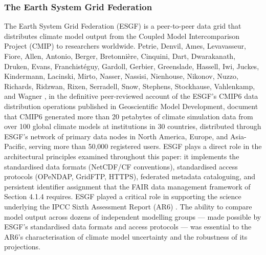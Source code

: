 \documentclass[12pt,a4paper]{report}
\begin{document}
\subsubsection{The Earth System Grid Federation}
The Earth System Grid Federation (ESGF) is a peer-to-peer data grid that distributes climate model output from the Coupled Model 
Intercomparison Project (CMIP) to researchers worldwide. Petrie, Denvil, Ames, Levavasseur, Fiore, Allen, Antonio, Berger, Bretonnière, 
Cinquini, Dart, Dwarakanath, Druken, Evans, Franchistéguy, Gardoll, Gerbier, Greenslade, Hassell, Iwi, Juckes, Kindermann, Lacinski, Mirto, 
Nasser, Nassisi, Nienhouse, Nikonov, Nuzzo, Richards, Ridzwan, Rixen, Serradell, Snow, Stephens, Stockhause, Vahlenkamp, and Wagner \parencite{petrie2021cmip6}, 
in the definitive peer-reviewed account of the ESGF’s CMIP6 data distribution operations published in Geoscientific Model Development, document 
that CMIP6 generated more than 20 petabytes of climate simulation data from over 100 global climate models at institutions in 30 countries, 
distributed through ESGF’s network of primary data nodes in North America, Europe, and Asia-Pacific, serving more than 50,000 registered users. 
ESGF plays a direct role in the architectural principles examined throughout this paper: it implements the standardised data formats
 (NetCDF/CF conventions), standardised access protocols (OPeNDAP, GridFTP, HTTPS), federated metadata cataloguing, and persistent identifier 
 assignment that the FAIR data management framework of Section 4.1.4 requires. ESGF played a critical role in supporting the science underlying 
 the IPCC Sixth Assessment Report (AR6) \parencite{boehm2022ipc}. The ability to compare model output across dozens of independent modelling 
 groups — made possible by ESGF’s standardised data formats and access protocols — was essential to the AR6’s characterisation of climate model
  uncertainty and the robustness of its projections.
\end{document}
